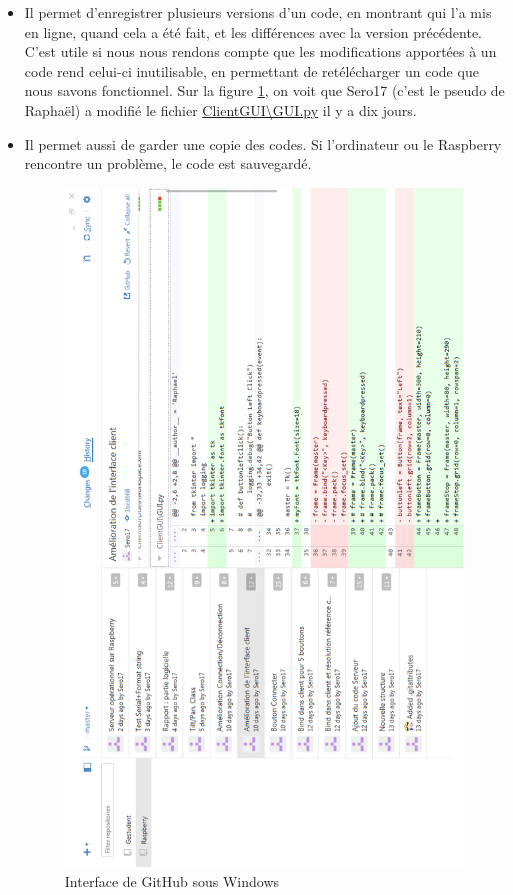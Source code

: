\documentclass[12pt,a4paper]{report}
\begin{document}
\begin{itemize}
\item Il permet d'enregistrer plusieurs versions d'un code, en montrant qui l'a mis en ligne, quand cela a été fait, et les différences avec la version précédente. C'est utile si nous nous rendons compte que les modifications apportées à un code rend celui-ci inutilisable, en permettant de retélécharger un code que nous savons fonctionnel. Sur la figure \ref{GitHub}, on voit que Sero17 (c'est le pseudo de Raphaël) a modifié le fichier \url{ClientGUI\GUI.py} il y a dix jours.
\item Il permet aussi de garder une copie des codes. Si l'ordinateur ou le Raspberry rencontre un problème, le code est sauvegardé.

\begin{figure}[hf!]
\center
\includegraphics[scale=0.7]{images/GitHub.png}
\caption{Interface de GitHub sous Windows}
\label{GitHub}
\end{figure}

\end{itemize}
\end{document}
